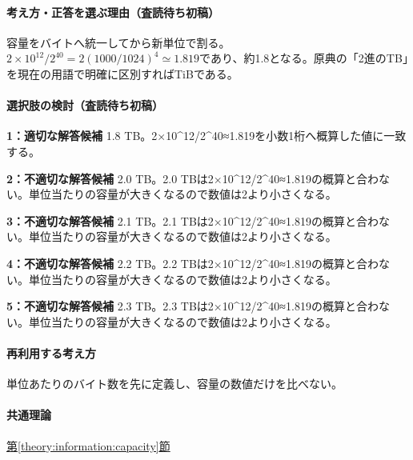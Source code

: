 \paragraph{考え方・正答を選ぶ理由（査読待ち初稿）} 容量をバイトへ統一してから新単位で割る。\(2\times10^{12}/2^{40}=2(1000/1024)^4\simeq1.819\)であり、約1.8となる。原典の「2進のTB」を現在の用語で明確に区別すればTiBである。

\paragraph{選択肢の検討（査読待ち初稿）}\mbox{}\par

\noindent\textbf{1：適切な解答候補} 1.8 TB。2×10\textasciicircum{}12/2\textasciicircum{}40≈1.819を小数1桁へ概算した値に一致する。\par

\noindent\textbf{2：不適切な解答候補} 2.0 TB。2.0 TBは2×10\textasciicircum{}12/2\textasciicircum{}40≈1.819の概算と合わない。単位当たりの容量が大きくなるので数値は2より小さくなる。\par

\noindent\textbf{3：不適切な解答候補} 2.1 TB。2.1 TBは2×10\textasciicircum{}12/2\textasciicircum{}40≈1.819の概算と合わない。単位当たりの容量が大きくなるので数値は2より小さくなる。\par

\noindent\textbf{4：不適切な解答候補} 2.2 TB。2.2 TBは2×10\textasciicircum{}12/2\textasciicircum{}40≈1.819の概算と合わない。単位当たりの容量が大きくなるので数値は2より小さくなる。\par

\noindent\textbf{5：不適切な解答候補} 2.3 TB。2.3 TBは2×10\textasciicircum{}12/2\textasciicircum{}40≈1.819の概算と合わない。単位当たりの容量が大きくなるので数値は2より小さくなる。\par

\paragraph{再利用する考え方} 単位あたりのバイト数を先に定義し、容量の数値だけを比べない。

\paragraph{共通理論} \hyperref[theory:information:capacity]{第\ref*{theory:information:capacity}節}


